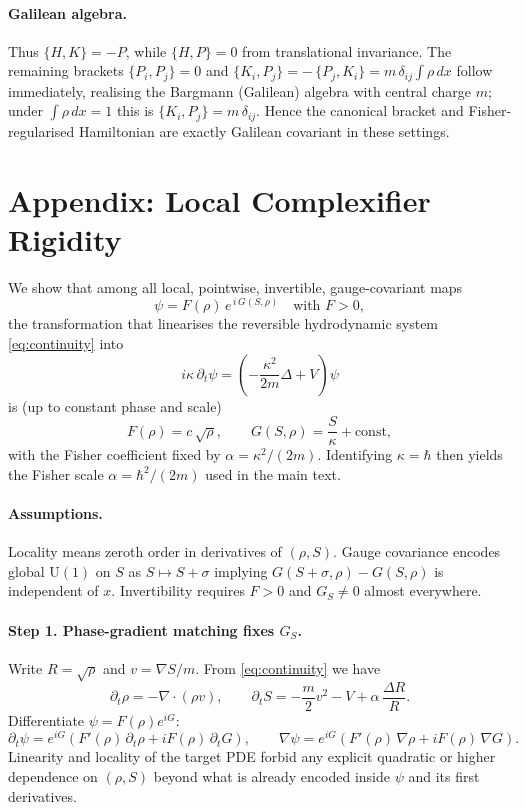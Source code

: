 \documentclass[11pt,a4paper]{article}
\numberwithin{equation}{section}
\theoremstyle{thmcompact}
\theoremstyle{remark}
\begin{document}
\paragraph{Galilean algebra.}
Thus $\{H,K\}=-P$, while $\{H,P\}=0$ from translational invariance. The
remaining brackets $\{P_i,P_j\}=0$ and
$\{K_i,P_j\}=-\,\{P_j,K_i\}=m\,\delta_{ij}\!\int\!\rho\,dx$ follow immediately,
realising the Bargmann (Galilean) algebra with central charge $m$; under
$\int\rho\,dx=1$ this is $\{K_i,P_j\}=m\,\delta_{ij}$. Hence the canonical
bracket and Fisher-regularised Hamiltonian are exactly Galilean covariant in
these settings.


\section{Appendix: Local Complexifier Rigidity}
\label{app:complexifier}

We show that among all local, pointwise, invertible, gauge-covariant maps
\[
\psi=F(\rho)\,e^{\,i\,G(S,\rho)}\quad\text{with }F>0,
\]
the transformation that linearises the reversible hydrodynamic system
\eqref{eq:continuity} into
\[
i\kappa\,\partial_t\psi
=\left(-\frac{\kappa^2}{2m}\Delta+V\right)\psi
\]
is (up to constant phase and scale)
\[
F(\rho)=c\,\sqrt{\rho},\qquad G(S,\rho)=\frac{S}{\kappa}+\text{const},
\]
with the Fisher coefficient fixed by $\alpha=\kappa^2/(2m)$. Identifying $\kappa=\hbar$ then yields the Fisher scale $\alpha=\hbar^{2}/(2m)$ used in the main text.

\paragraph{Assumptions.}
Locality means zeroth order in derivatives of $(\rho,S)$.
Gauge covariance encodes global $\mathrm{U}(1)
$ on $S$ as $S\mapsto S+\sigma$ implying $G(S+\sigma,\rho)-G(S,\rho)$ is independent of $x$.
Invertibility requires $F>0$ and $G_S\neq0$ almost everywhere.

\paragraph{Step 1. Phase-gradient matching fixes $G_S$.}
Write $R=\sqrt{\rho}$ and $v=\nabla S/m$.
From \eqref{eq:continuity} we have
\[
\partial_t\rho=-\nabla\!\cdot(\rho v),\qquad
\partial_t S=-\frac{m}{2}v^2-V+\alpha\,\frac{\Delta R}{R}.
\]
Differentiate $\psi=F(\rho)e^{iG}$:
\[
\partial_t\psi=e^{iG}\left(F'(\rho)\,\partial_t\rho+iF(\rho)\,\partial_t G\right),\qquad
\nabla\psi=e^{iG}\left(F'(\rho)\,\nabla\rho+iF(\rho)\,\nabla G\right).
\]
Linearity and locality of the target PDE forbid any explicit quadratic or higher dependence on $(\rho,S)$ beyond what is already encoded inside $\psi$ and its first derivatives.
\end{document}
